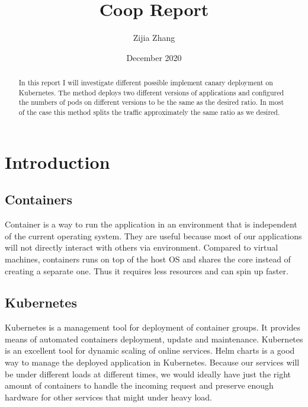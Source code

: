 \documentclass{article}
\title{Coop Report}
\author{Zijia Zhang }
\date{December 2020}
\begin{document}
\maketitle



\begin{abstract}
    In this report I will investigate different possible implement canary deployment on Kubernetes. The method deploys two different versions of applications and configured the numbers of pods on different versions to be the same as the desired ratio. In most of the case this method splits the traffic approximately the same ratio as we desired.
\end{abstract}

\tableofcontents

\pagebreak

\section{Introduction}
\subsection{Containers}
Container is a way to run the application in an environment that is independent of the current operating system. They are useful because most of our applications will not directly interact with others via environment. Compared to virtual machines, containers runs on top of the host OS and shares the core instead of creating a separate one. Thus it requires less resources and can spin up faster. 
\subsection{Kubernetes}
Kubernetes is a management tool for deployment of container groups. It provides means of automated containers deployment, update and maintenance. Kubernetes is an excellent tool for dynamic scaling of online services. Helm charts is a good way to manage the deployed application in Kubernetes. Because our services will be under different loads at different times, we would ideally have just the right amount of containers to handle the incoming request and preserve enough hardware for other services that might under heavy load.
\end{document}
